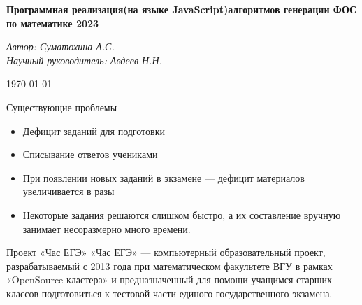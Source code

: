 \documentclass[aspectratio=169]{beamer}
\begin{document}
\begin{frame}
   \begin{center}
    \vspace{1.5cm}
    \Large\textcolor{NordBrightBlue}{\textbf{Программная реализация(на языке JavaScript)алгоритмов генерации ФОС по математике 2023}}\\
        \end{center}
        \vspace{1cm}
        \large\textcolor{NordBlue}{\textit{Автор: Суматохина А.С.}}\\
        \large\textcolor{NordBlue}{\textit{Научный руководитель: Авдеев Н.Н.}}\\
        \vspace{1cm}
        \begin{center}
            \today
        \end{center}
        
\end{frame}

\begin{frame}{Существующие проблемы}
    \begin{itemize}
        \item Дефицит заданий для подготовки
        \item Списывание ответов учениками
        \item При появлении новых заданий в экзамене — дефицит материалов увеличивается в разы
        \item Некоторые задания решаются слишком быстро, а их составление вручную занимает несоразмерно много времени.
    \end{itemize}
\end{frame}

\begin{frame}{Проект «Час ЕГЭ»}
    «Час ЕГЭ» — компьютерный образовательный проект, разрабатываемый с 2013 года при математическом факультете ВГУ в рамках «OpenSource кластера» и предназначенный для помощи учащимся старших классов подготовиться к тестовой части единого государственного экзамена.
\end{frame}
\end{document}

